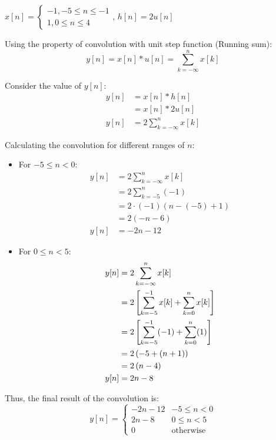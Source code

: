 \documentclass[a4paper, 10pt]{article}
\begin{document}
\begin{tosubmit}
\begin{subproblems}[start=1]
    \item \( x[n] = \begin{cases} -1 , -5 \leq n \leq -1 \\ 1 , 0 \leq n \leq 4 \end{cases},\, h[n] = 2u[n] \)
\end{subproblems}

\par\noindent\submitsolution
Using the property of convolution with unit step function (Running sum):
\[ y[n] = x[n] * u[n] = \sum_{k=-\infty}^{n} x[k] \]

Consider the value of \( y[n] \):
\begin{align*}
    y[n] &= x[n] * h[n] \\
    &= x[n] * 2u[n] \\
    y[n] &= 2 \sum_{k=-\infty}^{n} x[k]
\end{align*}

Calculating the convolution for different ranges of \( n \):
\begin{itemize}
    \item For \( -5 \leq n < 0 \):
    \begin{align*}
        y[n] &= 2 \sum_{k=-\infty}^{n} x[k] \\
        &= 2 \sum_{k=-5}^{n} (-1) \\
        &= 2 \cdot (-1)(n - (-5) + 1) \\
        &= 2 (-n - 6) \\
        y[n] &= -2n - 12
    \end{align*}

    \item For \( 0 \leq n < 5 \):
    \begin{align*}
        y[n] &= 2 \sum_{k=-\infty}^{n} x[k] \\
        &= 2 \left[ \sum_{k=-5}^{-1} x[k] + \sum_{k=0}^{n} x[k] \right] \\
        &= 2 \left[ \sum_{k=-5}^{-1} (-1) + \sum_{k=0}^{n} (1) \right] \\
        &= 2 \left( -5 + (n + 1) \right) \\
        &= 2 \left( n - 4 \right) \\
        y[n] &= 2n - 8
    \end{align*}
\end{itemize}

Thus, the final result of the convolution is:
\[ \boxed{
y[n] = \begin{cases}
-2n - 12 & -5 \leq n < 0 \\
2n - 8 & 0 \leq n < 5 \\
0 & \text{otherwise}
\end{cases}
} \]
\end{tosubmit}
\end{document}
